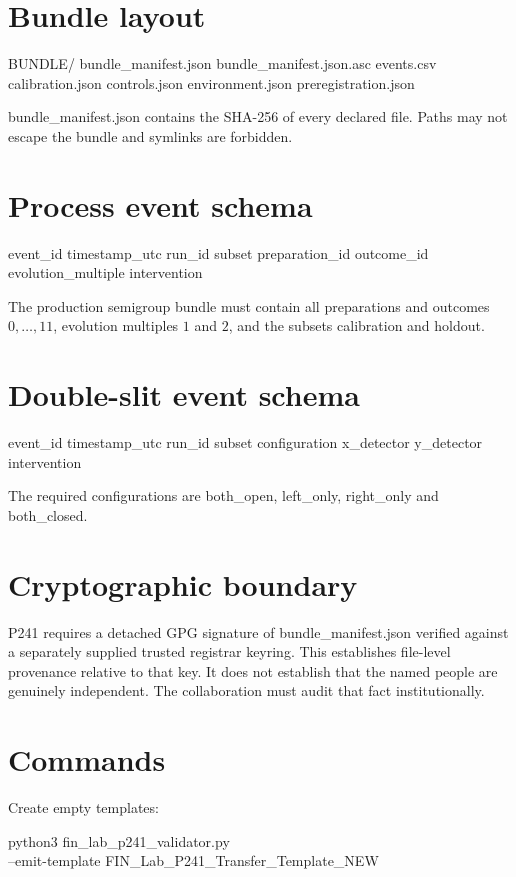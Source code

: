\documentclass[11pt,a4paper,openany]{report}
\begin{document}
\section{Bundle layout}

BUNDLE/\allowbreak{} bundle\_manifest.json bundle\_manifest.json.asc events.csv calibration.json controls.json environment.json preregistration.json

bundle\_manifest.json contains the SHA-256 of every declared file. Paths may not escape the bundle and symlinks are forbidden.

\section{Process event schema}

event\_id timestamp\_utc run\_id subset preparation\_id outcome\_id evolution\_multiple intervention

The production semigroup bundle must contain all preparations and outcomes \(0,\ldots,11\), evolution multiples \(1\) and \(2\), and the subsets calibration and holdout.

\section{Double-slit event schema}

event\_id timestamp\_utc run\_id subset configuration x\_detector y\_detector intervention

The required configurations are both\_open, left\_only, right\_only and both\_closed.

\section{Cryptographic boundary}

P241 requires a detached GPG signature of bundle\_manifest.json verified against a separately supplied trusted registrar keyring. This establishes file-level provenance relative to that key. It does not establish that the named people are genuinely independent. The collaboration must audit that fact institutionally.

\section{Commands}

Create empty templates:

python3 fin\_lab\_p241\_validator.py \\
--emit-template FIN\_Lab\_P241\_Transfer\_Template\_NEW
\end{document}
